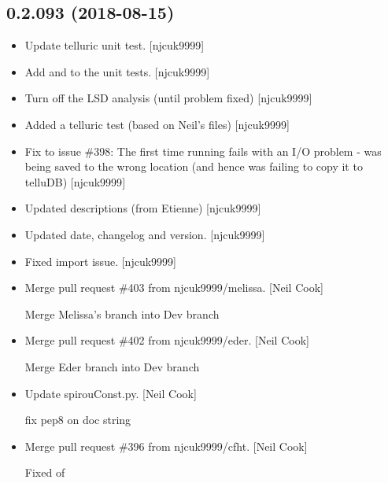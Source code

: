\documentclass[a4paper,10pt,english]{report}
\begin{document}
\subsection{0.2.093 (2018-08-15)}
\label{\detokenize{misc/changelog:id369}}\begin{itemize}
\item {} 
Update telluric unit test. {[}njcuk9999{]}

\item {} 
Add  and  to the unit tests. {[}njcuk9999{]}

\item {} 
Turn off the LSD analysis (until problem fixed) {[}njcuk9999{]}

\item {} 
Added a telluric test (based on Neil’s files) {[}njcuk9999{]}

\item {} 
Fix to issue \#398: The first time running  fails with an
I/O problem -  was being saved to the wrong location (and
hence  was failing to copy it to telluDB) {[}njcuk9999{]}

\item {} 
Updated descriptions (from Etienne) {[}njcuk9999{]}

\item {} 
Updated date, changelog and version. {[}njcuk9999{]}

\item {} 
Fixed import issue. {[}njcuk9999{]}

\item {} 
Merge pull request \#403 from njcuk9999/melissa. {[}Neil Cook{]}

Merge Melissa’s branch into Dev branch

\item {} 
Merge pull request \#402 from njcuk9999/eder. {[}Neil Cook{]}

Merge Eder branch into Dev branch

\item {} 
Update spirouConst.py. {[}Neil Cook{]}

fix pep8 on doc string

\item {} 
Merge pull request \#396 from njcuk9999/cfht. {[}Neil Cook{]}

Fixed  of 

\end{itemize}
\end{document}
